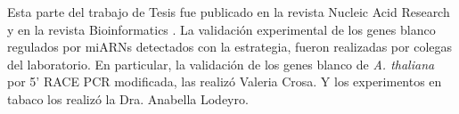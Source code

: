 Esta parte del trabajo de Tesis fue publicado en la revista Nucleic Acid Research \citep{Chorostecki05072012} y en la revista Bioinformatics \citep{Chorostecki2014}.
La validación experimental de los genes blanco regulados por miARNs detectados con la estrategia, fueron realizadas por colegas del laboratorio.
En particular, la validación de los genes blanco de \textit{A. thaliana} por 5' RACE PCR modificada, las realizó Valeria Crosa.
Y los experimentos en tabaco los realizó la Dra. Anabella Lodeyro.
